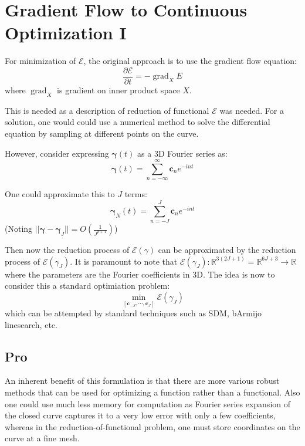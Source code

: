 \documentclass[a4paper]{article}
\theoremstyle{definition}
\newcommand{\norm}[1]{||#1||}
\DeclareMathOperator{\grad}{grad}
\begin{document}
\section{Gradient Flow to Continuous Optimization I}
For minimization of $\mathcal{E}$, the original approach is to use the gradient flow equation:
\begin{equation}
    \frac{\partial \mathcal{E}}{\partial t} = - \grad_X {E}
\end{equation}
where $\grad_X$ is gradient on inner product space $X$.

This is needed as a description of reduction of functional $\mathcal{E}$ was needed.
For a solution, one would could use a numerical method to solve the differential equation
by sampling at different points on the curve.

However, consider expressing $\boldsymbol{\gamma}(t)$ as a 3D Fourier series as:
\begin{equation}
    \boldsymbol{\gamma}(t) = \sum_{n=-\infty}^{\infty} \mathbf{c}_n e^{-int}
\end{equation}

One could approximate this to $J$ terms:
\begin{equation}
    \boldsymbol{\gamma}_N (t) = \sum_{n = -J}^{J} \mathbf{c}_n e^{-int}
\end{equation}
(Noting $\norm{\boldsymbol{\gamma} - \boldsymbol{\gamma}_J} = O\left( \frac{1}{J^{p+1}} \right)$)

Then now the reduction process of $\mathcal{E}\left( \gamma \right)$ can be approximated by the reduction process of $\mathcal{E}\left( \gamma_J \right)$.
It is paramount to note that $\mathcal{E} \left( \gamma_J \right): \mathbb{R}^{3\left( 2J + 1 \right)} = \mathbb{R}^{6J + 3} \rightarrow \mathbb{R}$ where the parameters are the Fourier coefficients in 3D.
The idea is now to consider this a standard optimiation problem:
\begin{equation}
    \min_{\left[ \mathbf{c}_{-J}, \cdots, \mathbf{c}_{J} \right]} \mathcal{E} \left( \gamma_J \right)
\end{equation}
which can be attempted by standard techniques such as SDM, bArmijo linesearch, etc.

\subsection{Pro}
An inherent benefit of this formulation is that there are more various robust methods that can be used for optimizing a function rather than a functional.
Also one could use much less memory for computation as Fourier series expansion of the closed curve captures it to a very low error with only a few coefficients, whereas in the reduction-of-functional problem, one must store coordinates on the curve at a fine mesh.
\end{document}
